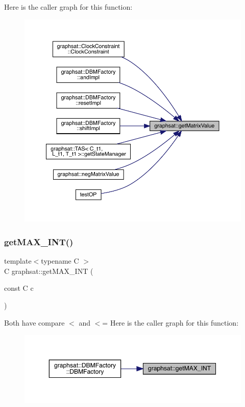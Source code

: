 Here is the caller graph for this function\+:
\nopagebreak
\begin{figure}[H]
\begin{center}
\leavevmode
\includegraphics[width=350pt]{namespacegraphsat_aaff479d8398d3b14b5a7126da128b136_icgraph}
\end{center}
\end{figure}
\mbox{\label{namespacegraphsat_a700d4c7efdb81dea623ce0d8f5c6aafc}} 
\subsubsection{\texorpdfstring{getMAX\_INT()}{getMAX\_INT()}}
{\footnotesize\ttfamily template$<$typename C $>$ \\
C graphsat\+::get\+M\+A\+X\+\_\+\+I\+NT (\begin{DoxyParamCaption}\item[{const C}]{c }\end{DoxyParamCaption})\hspace{0.3cm}{\ttfamily [inline]}}

Both have compare $<$ and $<$= Here is the caller graph for this function\+:
\nopagebreak
\begin{figure}[H]
\begin{center}
\leavevmode
\includegraphics[width=350pt]{namespacegraphsat_a700d4c7efdb81dea623ce0d8f5c6aafc_icgraph}
\end{center}
\end{figure}
\mbox{\label{namespacegraphsat_a7365b322cc23cabf0402ef03e6daafc7}} 
